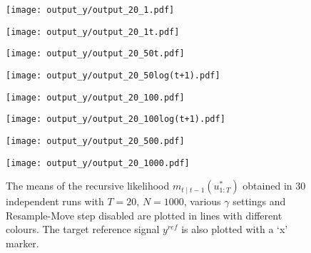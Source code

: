 \begin{figure}[!thbp]
    \centering
    \begin{minipage}{.5\textwidth}
        \centering
        \texttt{[image: output\_y/output\_20\_1.pdf]}
    \end{minipage}%
    \begin{minipage}{0.5\textwidth}
        \centering
        \texttt{[image: output\_y/output\_20\_1t.pdf]}
    \end{minipage}
    \begin{minipage}{0.5\textwidth}
        \centering
        \texttt{[image: output\_y/output\_20\_50t.pdf]}
    \end{minipage}%
    \begin{minipage}{0.5\textwidth}
        \centering
        \texttt{[image: output\_y/output\_20\_50log(t+1).pdf]}
    \end{minipage}
    \begin{minipage}{0.5\textwidth}
        \centering
        \texttt{[image: output\_y/output\_20\_100.pdf]}
    \end{minipage}%
    \begin{minipage}{0.5\textwidth}
        \centering
        \texttt{[image: output\_y/output\_20\_100log(t+1).pdf]}
    \end{minipage}
    \begin{minipage}{0.5\textwidth}
        \centering
        \texttt{[image: output\_y/output\_20\_500.pdf]}
    \end{minipage}%
    \begin{minipage}{0.5\textwidth}
        \centering
        \texttt{[image: output\_y/output\_20\_1000.pdf]}
    \end{minipage}
    \caption{The means of the recursive likelihood $m_{t \mid t-1}(u^*_{1:T})$ obtained in $30$ independent runs with $T=20$, $N=1000$, various $\gamma$ settings and Resample-Move step disabled are plotted in lines with different colours. The target reference signal $y^{ref}$ is also plotted with a `x' marker.}
    \label{fig:estimatedy}
\end{figure}

